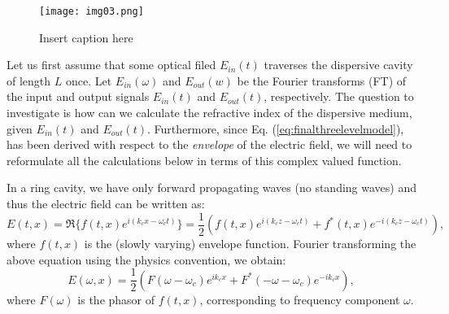 \documentclass[10pt,letterpaper]{article}
\begin{document}
{\begin{figure}[h!]
	\begin{center}
		\texttt{[image: img03.png]}
		\caption{Insert caption here} \label{fig:img03}
	\end{center}	
\end{figure}

Let us first assume that some optical filed $E_{in}(t)$ traverses the dispersive cavity of length $L$ once. Let $E_{in}(\omega)$ and $E_{out}(w)$ be the Fourier transforms (FT) of the input and output signals $E_{in}(t)$ and $E_{out}(t)$, respectively. The question to investigate is how can we calculate the refractive index of the dispersive medium, given $E_{in}(t)$ and $E_{out}(t)$. Furthermore, since Eq. (\ref{eq:finalthreelevelmodel}), has been derived with respect to the \emph{envelope} of the electric field, we will need to reformulate all the calculations below in terms of this complex valued function. 

In a ring cavity, we have only forward propagating waves (no standing waves) and thus the electric field can be written as:
\begin{equation}
E(t,x) = \Re\{f(t,x)e^{i (k_c x - \omega_c t) }\} = \frac{1}{2} \left ( f(t,x)e^{i (k_c z - \omega_c t)} +f^*(t,x) e^{-i (k_c z - \omega_c t) }\right) ,
\end{equation}
where $f(t,x)$ is the (slowly varying) envelope function. Fourier transforming the above equation using the physics convention, we obtain:
\begin{equation}
E(\omega,x) = \frac{1}{2} \left( F(\omega-\omega_c)e^{ik_cx} +  F^*(-\omega-\omega_c)e^{-ik_cx} \right), 
\end{equation}
where $F(\omega)$  is the phasor of $f(t,x)$, corresponding to frequency component $\omega$.

}
\end{document}
